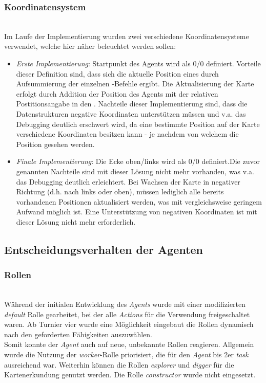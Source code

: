 \subsubsection{Koordinatensystem} ~\\
Im Laufe der Implementierung wurden zwei verschiedene Koordinatensysteme verwendet, welche hier näher beleuchtet werden sollen: 
\begin{itemize}
	\item \textit{Erste Implementierung}: Startpunkt des Agents wird als 0/0 definiert. \newline Vorteile dieser Definition sind, dass sich die aktuelle Position eines \Agents durch Aufsummierung der einzelnen \move-Befehle ergibt. Die Aktualisierung der Karte erfolgt durch Addition der Position des Agents mit der relativen Postitionsangabe in den \Percepts. Nachteile dieser Implementierung sind, dass die Datenstrukturen negative Koordinaten unterstützen müssen und v.a. das Debugging deutlich erschwert wird, da eine bestimmte Position auf der Karte verschiedene Koordinaten besitzen kann - je nachdem von welchem \Agent die Position \glqq{}gesehen\grqq{} werden. 
	\item \textit{Finale Implementierung}: Die Ecke oben/links wird als 0/0 definiert.\newline Die zuvor genannten Nachteile sind mit dieser Lösung nicht mehr vorhanden, was v.a. das Debugging deutlich erleichtert. Bei \glqq{}Wachsen\grqq{} der Karte in negativer Richtung (d.h. nach links oder oben), müssen lediglich alle bereits vorhandenen Positionen aktualisiert werden, was mit vergleichsweise geringem Aufwand möglich ist. Eine Unterstützung von negativen Koordinaten ist mit dieser Lösung nicht mehr erforderlich. 
\end{itemize}

\subsection{Entscheidungsverhalten der Agenten} \label{kap:entscheidungAgenten}

\subsubsection{Rollen} ~\\
Während der initialen Entwicklung des \textit{Agents} wurde mit einer modifizierten \textit{default} Rolle gearbeitet, bei der alle \textit{Actions} für die Verwendung freigeschaltet waren. Ab Turnier vier wurde eine Möglichkeit eingebaut die Rollen dynamisch nach den geforderten Fähigkeiten auszuwählen. \\
Somit konnte der \textit{Agent} auch auf neue, unbekannte Rollen reagieren. Allgemein wurde die Nutzung der \textit{worker}-Rolle priorisiert, die für den \textit{Agent} bis 2er \textit{task} ausreichend war. Weiterhin können die Rollen  \textit{explorer} und  \textit{digger} für die Kartenerkundung genutzt werden. Die Rolle \textit{constructor} wurde nicht eingesetzt.

